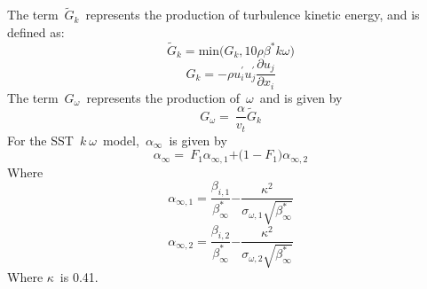 \documentclass[Afour,sagev,times]{sagej}
\begin{document}
\noindent The term~${\tilde{G}}_k$~represents the production of turbulence kinetic energy, and is defined as:
\begin{equation} \label{GrindEQ__14_} 
{\tilde{G}}_k\mathrm{=min(}G_k\mathrm{,10}\rho {\beta }^{\mathrm{*}}k\omega \mathrm{)} 
\end{equation} 
\begin{equation} \label{GrindEQ__15_} 
G_{k}\mathrm{=-}\rho u_{i}^{'}u_{j}^{'}\frac{\partial u_{j}}{\partial x_{i}} 
\end{equation} 
The term~$G_{\omega }$~represents the production of~$\omega $~and is given by
\begin{equation} \label{GrindEQ__16_} 
G_{\omega }\mathrm{=\ }\frac{\alpha }{v_t}{\tilde{G}}_k 
\end{equation} 
For the SST~$k\ \omega $~model,~${\alpha }_{\infty }$~is given by
\begin{equation} \label{GrindEQ__17_} 
{\alpha }_{\mathrm{\infty }}\mathrm{=\ }F_{\mathrm{1}}{\alpha }_{\mathrm{\infty }\mathrm{,1}}\mathrm{+(1-}F_{\mathrm{1}}\mathrm{)}{\alpha }_{\mathrm{\infty }\mathrm{,2}} 
\end{equation} 
Where
\begin{equation} \label{GrindEQ__18_} 
{\alpha }_{\mathrm{\infty }\mathrm{,1}}\mathrm{=}\frac{{\beta }_{i\mathrm{,1}}}{{\beta }^{\mathrm{*}}_{\mathrm{\infty }}}\mathrm{-}\frac{{\kappa }^{\mathrm{2}}}{{\sigma }_{\omega \mathrm{,1}}\sqrt{{\beta }^{\mathrm{*}}_{\mathrm{\infty }}}} 
\end{equation} 
\begin{equation} \label{GrindEQ__19_} 
{\alpha }_{\mathrm{\infty }\mathrm{,2}}\mathrm{=}\frac{{\beta }_{i\mathrm{,2}}}{{\beta }^{\mathrm{*}}_{\mathrm{\infty }}}\mathrm{-}\frac{{\kappa }^{\mathrm{2}}}{{\sigma }_{\omega \mathrm{,2}}\sqrt{{\beta }^{\mathrm{*}}_{\mathrm{\infty }}}} 
\end{equation} 
Where \textit{$\kappa$}~is 0.41.
\end{document}
